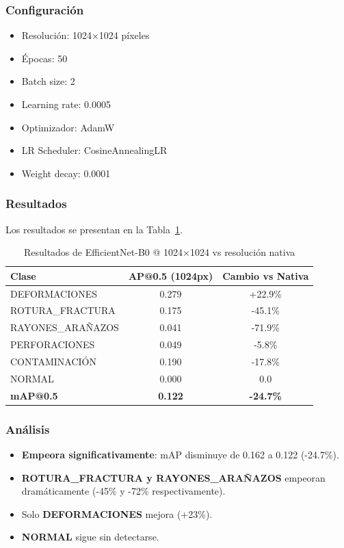 \subsubsection{Configuración}

\begin{itemize}
    \item Resolución: 1024×1024 píxeles
    \item Épocas: 50
    \item Batch size: 2
    \item Learning rate: 0.0005
    \item Optimizador: AdamW
    \item LR Scheduler: CosineAnnealingLR
    \item Weight decay: 0.0001
\end{itemize}

\subsubsection{Resultados}

Los resultados se presentan en la Tabla~\ref{tab:efficientnet_1024}.

\begin{table}[htbp]
\centering
\begin{tabular}{lcc}
\toprule
\textbf{Clase} & \textbf{AP@0.5 (1024px)} & \textbf{Cambio vs Nativa} \\
\midrule
DEFORMACIONES & 0.279 & +22.9\% \\
\mbox{ROTURA\_FRACTURA} & 0.175 & -45.1\% \\
\mbox{RAYONES\_ARAÑAZOS} & 0.041 & -71.9\% \\
PERFORACIONES & 0.049 & -5.8\% \\
CONTAMINACIÓN & 0.190 & -17.8\% \\
NORMAL & 0.000 & 0.0 \\
\midrule
\textbf{mAP@0.5} & \textbf{0.122} & \textbf{-24.7\%} \\
\bottomrule
\end{tabular}
\caption{Resultados de EfficientNet-B0 @ 1024×1024 vs resolución nativa}
\label{tab:efficientnet_1024}
\end{table}

\subsubsection{Análisis}

\begin{itemize}
    \item \textbf{Empeora significativamente}: mAP disminuye de 0.162 a 0.122 (-24.7\%).
    \item \textbf{\mbox{ROTURA\_FRACTURA} y \mbox{RAYONES\_ARAÑAZOS}} empeoran dramáticamente (-45\% y -72\% respectivamente).
    \item Solo \textbf{DEFORMACIONES} mejora (+23\%).
    \item \textbf{NORMAL} sigue sin detectarse.
\end{itemize}

